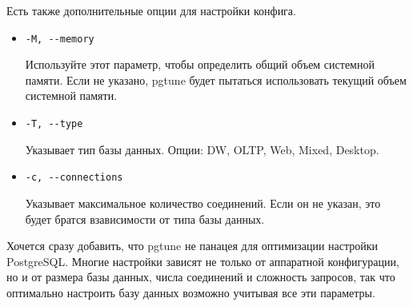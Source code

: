 Есть также дополнительные опции для настройки конфига. 
\begin{itemize}
\item 
\begin{verbatim}-M, --memory\end{verbatim}
Используйте этот параметр, чтобы определить общий объем системной памяти. 
Если не указано, pgtune будет пытаться использовать текущий объем системной памяти.

\item 
\begin{verbatim}-T, --type\end{verbatim}
Указывает тип базы данных. Опции: DW,  OLTP,  Web, Mixed, Desktop.

\item 
\begin{verbatim}-c, --connections\end{verbatim}
Указывает максимальное количество соединений. Если он не указан, это будет братся взависимости от типа базы данных.

\end{itemize}

Хочется сразу добавить, что pgtune не панацея для оптимизации настройки PostgreSQL. Многие настройки зависят не только от 
аппаратной конфигурации, но и от размера базы данных, числа соединений и сложность запросов, так что оптимально настроить базу данных 
возможно учитывая все эти параметры.